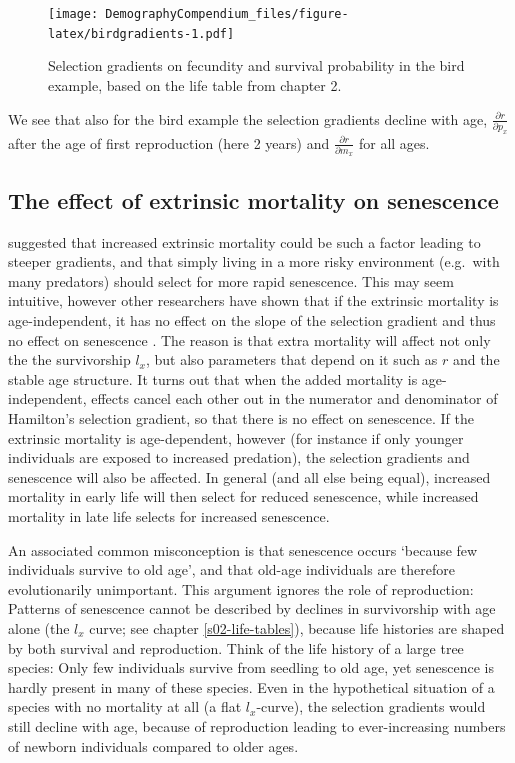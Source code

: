 \documentclass[
]{book}
\begin{document}
\begin{figure}
\centering
\texttt{[image: DemographyCompendium\_files/figure-latex/birdgradients-1.pdf]}
\caption{\label{fig:birdgradients}Selection gradients on fecundity and survival probability in the bird example, based on the life table from chapter 2.}
\end{figure}

We see that also for the bird example the selection gradients decline with age, \(\frac{\partial r}{\partial p_x}\) after the age of first reproduction (here 2 years) and \(\frac{\partial r}{\partial m_x}\) for all ages.

\hypertarget{the-effect-of-extrinsic-mortality-on-senescence}{%
\subsection*{The effect of extrinsic mortality on senescence}\label{the-effect-of-extrinsic-mortality-on-senescence}}

\citet{Williams1} suggested that increased extrinsic mortality could be such a factor leading to steeper gradients, and that simply living in a more risky environment (e.g.~with many predators) should select for more rapid senescence. This may seem intuitive, however other researchers have shown that if the extrinsic mortality is age-independent, it has no effect on the slope of the selection gradient and thus no effect on senescence \citep{Hamilton1, Caswell7, Wensink1}. The reason is that extra mortality will affect not only the the survivorship \(l_x\), but also parameters that depend on it such as \(r\) and the stable age structure. It turns out that when the added mortality is age-independent, effects cancel each other out in the numerator and denominator of Hamilton's selection gradient, so that there is no effect on senescence. If the extrinsic mortality is age-dependent, however (for instance if only younger individuals are exposed to increased predation), the selection gradients and senescence will also be affected. In general (and all else being equal), increased mortality in early life will then select for reduced senescence, while increased mortality in late life selects for increased senescence.

An associated common misconception is that senescence occurs `because few individuals survive to old age', and that old-age individuals are therefore evolutionarily unimportant. This argument ignores the role of reproduction: Patterns of senescence cannot be described by declines in survivorship with age alone (the \(l_x\) curve; see chapter \ref{s02-life-tables}), because life histories are shaped by both survival and reproduction. Think of the life history of a large tree species: Only few individuals survive from seedling to old age, yet senescence is hardly present in many of these species. Even in the hypothetical situation of a species with no mortality at all (a flat \(l_x\)-curve), the selection gradients would still decline with age, because of reproduction leading to ever-increasing numbers of newborn individuals compared to older ages.
\end{document}
